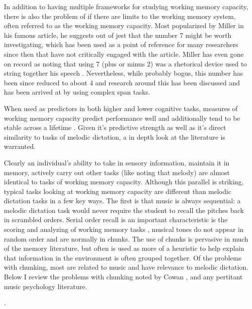 \documentclass[]{book}
\theoremstyle{definition}
\theoremstyle{definition}
\theoremstyle{definition}
\theoremstyle{remark}
\begin{document}
In addition to having multiple frameworks for studying working memory
capacity, there is also the problem of if there are limits to the
working memory system, often referred to as the working memory capacity.
Most popularized by Miller in his famous
\citep{millerMagicalNumberSeven1956} article, he suggests out of jest
that the number 7 might be worth investigating, which has been used as a
point of reference for many researchers since then that have not
critically engaged with the article. Miller has even gone on record as
noting that using 7 (plus or minus 2) was a rhetorical device used to
string together his speech
\citep{millerHistoryPsychologyAutobiography1989}. Nevertheless, while
probably bogus, this number has been since reduced to about 4
\citep{cowanMagicalMysteryFour2010} and research around this has been
discussed and has been arrived at by using complex span tasks.

When used as predictors in both higher and lower cognitive tasks,
measures of working memory capacity predict performance well and
additionally tend to be stable across a lifetime
\citep{unsworthAutomatedVersionOperation2005}. Given it's predictive
strength as well as it's direct similarity to tasks of melodic
dictation, a in depth look at the literature is warranted.

Clearly an individual's ability to take in sensory information, maintain
it in memory, actively carry out other tasks (like noting that melody)
are almost identical to tasks of working memory capacity. Although this
parallel is striking, typical tasks looking at working memory capacity
are different than melodic dictation tasks in a few key ways. The first
is that music is always sequential: a melodic dictation task would never
require the student to recall the pitches back in scrambled orders.
Serial order recall is an important characteristic is the scoring and
analyzing of working memory tasks \citep{conwayWorkingMemorySpan2005},
musical tones do not appear in random order and are normally in chunks.
The use of chunks is pervasive in much of the memory literature, but
often is used as more of a heuristic to help explain that information in
the environment is often grouped together. Of the problems with
chunking, most are related to music and have relevance to melodic
dictation. Below I review the problems with chunking noted by Cowan
\citep{cowanWorkingMemoryCapacity2005}, and any pertitant music
psychology literature.

\citep{krumhanslCognitiveFoundationsMusical2001, meyerEmotionMeaningMusic1956}.
\end{document}
